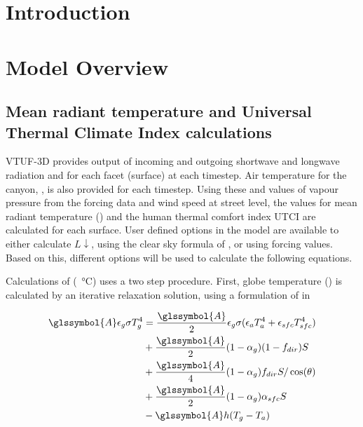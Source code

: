 \documentclass[final,3p,times,authoryear]{elsarticle}
\begin{document}
\section{Introduction}\label{sec:introduction}





\section{Model Overview}\label{sec:ModelOverview}



\subsection{Mean radiant temperature and Universal Thermal Climate Index calculations}\label{sec:tmrtutci}

VTUF-3D provides output of incoming and outgoing shortwave and longwave radiation and  for each facet (surface) at each timestep. Air temperature for the canyon, , is also provided for each timestep. Using these and values of vapour pressure from the forcing data and wind speed at street level, the values for mean radiant temperature () and the human thermal comfort index UTCI are calculated for each surface. User defined options in the model are available to either calculate $L\downarrow$, using the clear sky formula of \cite{Prata1996}, or using forcing values. Based on this, different options will be used to calculate the following equations.

 

Calculations of  (\SI{}{\degreeCelsius}) uses a two step procedure. First, globe temperature () is calculated by an iterative relaxation solution, using a formulation of \cite{Liljegren2008} in  

\begin{equation}\label{eq:tg2}
\begin{split}
\glssymbol{A}\epsilon_{g}\sigma T_{g}^{4} &= \frac{\glssymbol{A}}{2} \epsilon_{g}\sigma( \epsilon_{a} T_{a}^{4} +  \epsilon_{sfc} T_{sfc}^{4} ) \\
&+ \frac{\glssymbol{A}}{2}( 1-\alpha_{g})(1-f_{dir})S  \\
&+ \frac{\glssymbol{A}}{4}( 1-\alpha_{g})f_{dir}S /\cos(\theta) \\
&+ \frac{\glssymbol{A}}{2}( 1-\alpha_{g})\alpha_{sfc}S \\
&- \glssymbol{A}h(T_{g}-T_{a})   
\end{split}
\end{equation}
\end{document}
